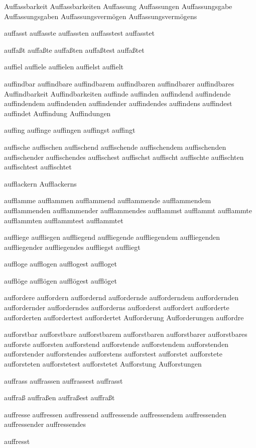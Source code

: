 Auffassbarkeit Auffassbarkeiten Auffassung Auffassungen Auffassungsgabe Auffassungsgaben Auffassungsvermögen Auffassungsvermögens

auffasst auffasste auffassten auffasstest auffasstet

auffaßt auffaßte auffaßten auffaßtest auffaßtet

auffiel auffiele auffielen auffielst auffielt

auffindbar auffindbare auffindbarem auffindbaren auffindbarer auffindbares Auffindbarkeit Auffindbarkeiten auffinde auffinden auffindend auffindende auffindendem auffindenden auffindender auffindendes auffindens auffindest auffindet Auffindung Auffindungen

auffing auffinge auffingen auffingst auffingt

auffische auffischen auffischend auffischende auffischendem auffischenden auffischender auffischendes auffischest auffischst auffischt auffischte auffischten auffischtest auffischtet

aufflackern Aufflackerns

aufflamme aufflammen aufflammend aufflammende aufflammendem aufflammenden aufflammender aufflammendes aufflammst aufflammt aufflammte aufflammten aufflammtest aufflammtet

auffliege auffliegen auffliegend auffliegende auffliegendem auffliegenden auffliegender auffliegendes auffliegst auffliegt

auffloge aufflogen aufflogest auffloget

aufflöge aufflögen aufflögest aufflöget

auffordere auffordern auffordernd auffordernde aufforderndem auffordernden auffordernder aufforderndes aufforderns aufforderst auffordert aufforderte aufforderten auffordertest auffordertet Aufforderung Aufforderungen auffordre

aufforstbar aufforstbare aufforstbarem aufforstbaren aufforstbarer aufforstbares aufforste aufforsten aufforstend aufforstende aufforstendem aufforstenden aufforstender aufforstendes aufforstens aufforstest aufforstet aufforstete aufforsteten aufforstetest aufforstetet Aufforstung Aufforstungen

auffrass auffrassen auffrassest auffrasst

auffraß auffraßen auffraßest auffraßt

auffresse auffressen auffressend auffressende auffressendem auffressenden auffressender auffressendes

auffresst

